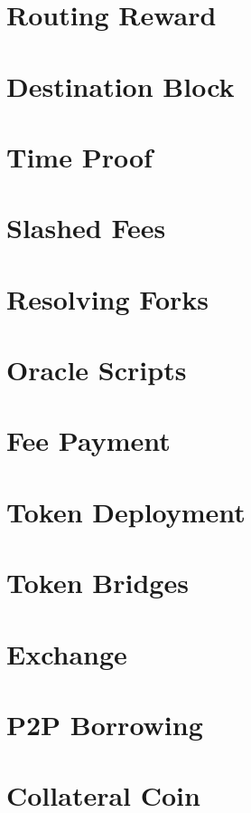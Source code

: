 \documentclass[a4paper,10pt]{article}
\begin{document}
\section{Routing Reward}
\section{Destination Block}
\section{Time Proof}
\section{Slashed Fees}
\section{Resolving Forks}
\section{Oracle Scripts}
\section{Fee Payment}
\section{Token Deployment}
\section{Token Bridges}
\section{Exchange}
\section{P2P Borrowing}
\section{Collateral Coin}
\end{document}
